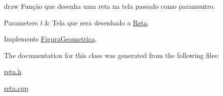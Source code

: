 draw Função que desenha uma reta na tela passado como paramentro. 


\begin{DoxyParams}{Parameters}
{\em t} & Tela que sera desenhado a \mbox{\hyperlink{class_reta}{Reta}}. \\
\hline
\end{DoxyParams}


Implements \mbox{\hyperlink{class_figura_geometrica_a8ee8dedc060b6059a805ea091aef2c41}{Figura\+Geometrica}}.



The documentation for this class was generated from the following files\+:\begin{DoxyCompactItemize}
\item 
\mbox{\hyperlink{reta_8h}{reta.\+h}}\item 
\mbox{\hyperlink{reta_8cpp}{reta.\+cpp}}\end{DoxyCompactItemize}
